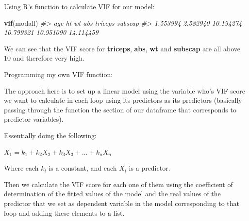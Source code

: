 \documentclass[]{article}
\newenvironment{Shaded}{\begin{snugshade}}{\end{snugshade}}
\newcommand{\CommentTok}[1]{\textcolor[rgb]{0.56,0.35,0.01}{\textit{#1}}}
\newcommand{\KeywordTok}[1]{\textcolor[rgb]{0.13,0.29,0.53}{\textbf{#1}}}
\newcommand{\NormalTok}[1]{#1}
\begin{document}
Using R's function to calculate VIF for our model:

\begin{Shaded}
\begin{Highlighting}[]
\KeywordTok{vif}\NormalTok{(modall)}
\CommentTok{#>       age        ht        wt       abs   triceps   subscap }
\CommentTok{#>  1.553994  2.582940 10.194274 10.799321 10.951090 14.114459}
\end{Highlighting}
\end{Shaded}

We can see that the VIF score for \textbf{triceps}, \textbf{abs},
\textbf{wt} and \textbf{subscap} are all above 10 and therefore very
high.

Programming my own VIF function:

The approach here is to set up a linear model using the variable who's
VIF score we want to calculate in each loop using its predictors as its
predictors (basically passing through the function the section of our
dataframe that corresponds to predictor variables).

Essentially doing the following:

\(X_{1} = k_{1} + k_{2} X_{2} + k_{3} X_{3} + \dots + k_{n} X_{n}\)

Where each \(k_{i}\) is a constant, and each \(X_{i}\) is a predictor.

Then we calculate the VIF score for each one of them using the
coefficient of determination of the fitted values of the model and the
real values of the predictor that we set as dependent variable in the
model corresponding to that loop and adding these elements to a list.
\end{document}
